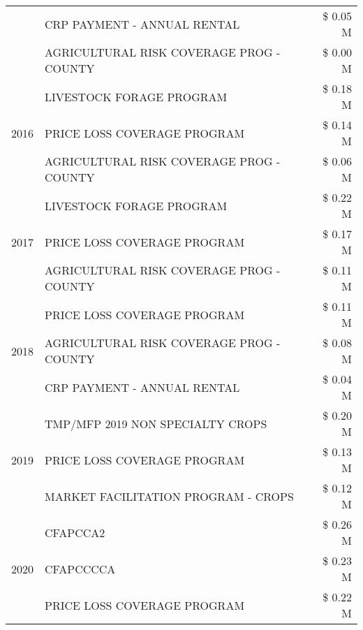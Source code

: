 \begin{tabular}{llr}
 & CRP PAYMENT - ANNUAL RENTAL & \$ 0.05 M \\
 & AGRICULTURAL RISK COVERAGE PROG - COUNTY & \$ 0.00 M \\
\cline{1-3}
\multirow[t]{3}{*}{2016} & LIVESTOCK FORAGE PROGRAM                      & \$ 0.18 M \\
 & PRICE LOSS COVERAGE PROGRAM                   & \$ 0.14 M \\
 & AGRICULTURAL RISK COVERAGE PROG - COUNTY      & \$ 0.06 M \\
\cline{1-3}
\multirow[t]{3}{*}{2017} & LIVESTOCK FORAGE PROGRAM & \$ 0.22 M \\
 & PRICE LOSS COVERAGE PROGRAM & \$ 0.17 M \\
 & AGRICULTURAL RISK COVERAGE PROG - COUNTY & \$ 0.11 M \\
\cline{1-3}
\multirow[t]{3}{*}{2018} & PRICE LOSS COVERAGE PROGRAM & \$ 0.11 M \\
 & AGRICULTURAL RISK COVERAGE PROG - COUNTY & \$ 0.08 M \\
 & CRP PAYMENT - ANNUAL RENTAL & \$ 0.04 M \\
\cline{1-3}
\multirow[t]{3}{*}{2019} & TMP/MFP 2019 NON SPECIALTY CROPS & \$ 0.20 M \\
 & PRICE LOSS COVERAGE PROGRAM & \$ 0.13 M \\
 & MARKET FACILITATION PROGRAM - CROPS & \$ 0.12 M \\
\cline{1-3}
\multirow[t]{3}{*}{2020} & CFAPCCA2 & \$ 0.26 M \\
 & CFAPCCCCA & \$ 0.23 M \\
 & PRICE LOSS COVERAGE PROGRAM & \$ 0.22 M \\
\cline{1-3}
\bottomrule
\end{tabular}
